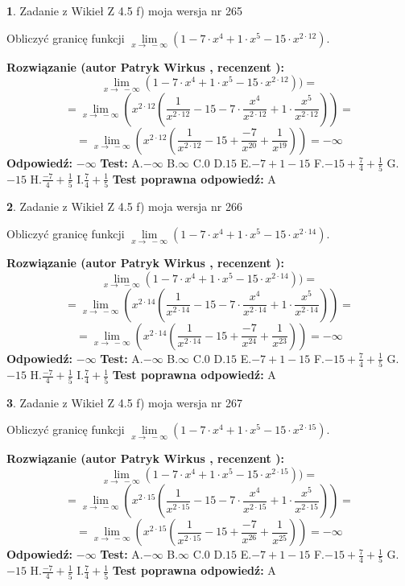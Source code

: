 \documentclass[12pt, a4paper]{article}
\theoremstyle{definition} %
\newtheorem{zad}{}
\newcommand{\zadStart}[1]{\begin{zad}#1\newline}
\newcommand{\zadStop}{\end{zad}}
\newcommand{\rozwStart}[2]{\noindent \textbf{Rozwiązanie (autor #1 , recenzent #2): }\newline}
\newcommand{\rozwStop}{\newline}
\newcommand{\odpStart}{\noindent \textbf{Odpowiedź:}\newline}
\newcommand{\odpStop}{\newline}
\newcommand{\testStart}{\noindent \textbf{Test:}\newline}
\newcommand{\testStop}{\newline}
\newcommand{\kluczStart}{\noindent \textbf{Test poprawna odpowiedź:}\newline}
\newcommand{\kluczStop}{\newline}
\begin{document}
\zadStart{Zadanie z Wikieł Z 4.5 f) moja wersja nr 265}



Obliczyć granicę funkcji  $\lim\limits_{x\to\ -\infty}(1 - 7 \cdot x^{4}+1 \cdot x^{5}- 15 \cdot x^{2\cdot12})$.
\zadStop
\rozwStart{Patryk Wirkus}{}
$$\lim\limits_{x\to\ -\infty}(1 - 7 \cdot x^{4}+1 \cdot x^{5}- 15 \cdot x^{2\cdot12}))=$$
$$=\lim\limits_{x\to\ -\infty}(x^{2\cdot12}(\frac{1}{x^{2\cdot12}}-15 -7 \cdot \frac{x^{4}}{x^{2\cdot12}}+1 \cdot \frac{x^{5}}{x^{2\cdot12}}))=$$
$$=\lim\limits_{x\to\ -\infty}(x^{2\cdot12}(\frac{1}{x^{2\cdot12}}-15 + \frac{-7}{x^{20}}+ \frac{1}{x^{19}}))=-\infty$$
\rozwStop
\odpStart
$-\infty$
\odpStop
\testStart
A.$-\infty$ B.$\infty$ C.$0$ D.$15$ E.$-7 + 1 - 15$
F.$-15+\frac{7}{4}+\frac{1}{5}$ G.$-15$
H.$\frac{-7}{4}+\frac{1}{5}$
I.$\frac{7}{4}+\frac{1}{5}$
\testStop
\kluczStart
A
\kluczStop



\zadStart{Zadanie z Wikieł Z 4.5 f) moja wersja nr 266}



Obliczyć granicę funkcji  $\lim\limits_{x\to\ -\infty}(1 - 7 \cdot x^{4}+1 \cdot x^{5}- 15 \cdot x^{2\cdot14})$.
\zadStop
\rozwStart{Patryk Wirkus}{}
$$\lim\limits_{x\to\ -\infty}(1 - 7 \cdot x^{4}+1 \cdot x^{5}- 15 \cdot x^{2\cdot14}))=$$
$$=\lim\limits_{x\to\ -\infty}(x^{2\cdot14}(\frac{1}{x^{2\cdot14}}-15 -7 \cdot \frac{x^{4}}{x^{2\cdot14}}+1 \cdot \frac{x^{5}}{x^{2\cdot14}}))=$$
$$=\lim\limits_{x\to\ -\infty}(x^{2\cdot14}(\frac{1}{x^{2\cdot14}}-15 + \frac{-7}{x^{24}}+ \frac{1}{x^{23}}))=-\infty$$
\rozwStop
\odpStart
$-\infty$
\odpStop
\testStart
A.$-\infty$ B.$\infty$ C.$0$ D.$15$ E.$-7 + 1 - 15$
F.$-15+\frac{7}{4}+\frac{1}{5}$ G.$-15$
H.$\frac{-7}{4}+\frac{1}{5}$
I.$\frac{7}{4}+\frac{1}{5}$
\testStop
\kluczStart
A
\kluczStop



\zadStart{Zadanie z Wikieł Z 4.5 f) moja wersja nr 267}



Obliczyć granicę funkcji  $\lim\limits_{x\to\ -\infty}(1 - 7 \cdot x^{4}+1 \cdot x^{5}- 15 \cdot x^{2\cdot15})$.
\zadStop
\rozwStart{Patryk Wirkus}{}
$$\lim\limits_{x\to\ -\infty}(1 - 7 \cdot x^{4}+1 \cdot x^{5}- 15 \cdot x^{2\cdot15}))=$$
$$=\lim\limits_{x\to\ -\infty}(x^{2\cdot15}(\frac{1}{x^{2\cdot15}}-15 -7 \cdot \frac{x^{4}}{x^{2\cdot15}}+1 \cdot \frac{x^{5}}{x^{2\cdot15}}))=$$
$$=\lim\limits_{x\to\ -\infty}(x^{2\cdot15}(\frac{1}{x^{2\cdot15}}-15 + \frac{-7}{x^{26}}+ \frac{1}{x^{25}}))=-\infty$$
\rozwStop
\odpStart
$-\infty$
\odpStop
\testStart
A.$-\infty$ B.$\infty$ C.$0$ D.$15$ E.$-7 + 1 - 15$
F.$-15+\frac{7}{4}+\frac{1}{5}$ G.$-15$
H.$\frac{-7}{4}+\frac{1}{5}$
I.$\frac{7}{4}+\frac{1}{5}$
\testStop
\kluczStart
A
\kluczStop
\end{document}
